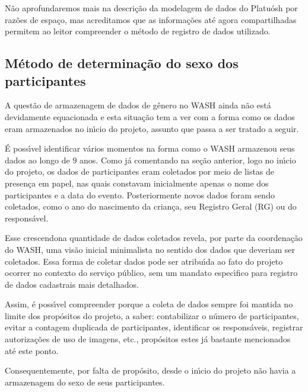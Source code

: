 \documentclass[
12pt,		%
openright,	%
twoside,  %
a4paper,			%
chapter=TITLE,		%
english,			%
french,				%
spanish,			%
brazil				%
]{USPSC-classe/USPSC}
\begin{document}
N\~ao aprofundaremos mais na descri\c{c}\~ao da modelagem de dados do Platu\'osh por raz\~oes de espa\c{c}o, mas acreditamos que as informa\c{c}\~oes at\'e agora compartilhadas permitem ao leitor compreender o m\'etodo de registro de dados utilizado.




\subsection[M\'etodo de determina\c{c}\~ao do sexo dos participantes]{M\'etodo de determina\c{c}\~ao do sexo dos participantes}\label{M\'etodo de determina\c{c}\~ao do sexo dos participantes}
A quest\~ao de armazenagem de dados de g\^enero no WASH ainda n\~ao est\'a devidamente equacionada e esta situa\c{c}\~ao tem a ver com a forma como os dados eram armazenados no in\'{\i}cio do projeto, assunto que passa a ser tratado a seguir.




\'E poss\'{\i}vel identificar v\'arios momentos na forma como o WASH armazenou seus dados ao longo de 9 anos. Como j\'a comentando na se\c{c}\~ao anterior, logo no in\'{\i}cio do projeto, os dados de participantes eram coletados por meio de listas de presen\c{c}a em papel, nas quais constavam inicialmente apenas o nome dos participantes e a data do evento. Posteriormente novos dados foram sendo coletados, como o ano do nascimento da crian\c{c}a, seu Registro Geral (RG) ou do respons\'avel.




Esse \textquotedbl crescendo\textquotedbl  na quantidade de dados coletados revela, por parte da coordena\c{c}\~ao do WASH, uma vis\~ao inicial minimalista no sentido dos dados que deveriam ser coletados. Essa forma de coletar dados pode ser atribu\'{\i}da ao fato do projeto ocorrer no contexto do servi\c{c}o p\'ublico, sem um mandato espec\'{\i}fico para registro de dados cadastrais mais detalhados.




Assim, \'e poss\'{\i}vel compreender porque a coleta de dados sempre foi mantida no limite dos prop\'ositos do projeto, a saber: contabilizar o n\'umero de participantes, evitar a contagem duplicada de participantes, identificar os respons\'aveis, registrar autoriza\c{c}\~oes de uso de imagens, etc., prop\'ositos estes j\'a bastante mencionados at\'e este ponto.




Consequentemente, por falta de prop\'osito, desde o in\'{\i}cio do projeto n\~ao havia a armazenagem do sexo de seus participantes.
\end{document}

